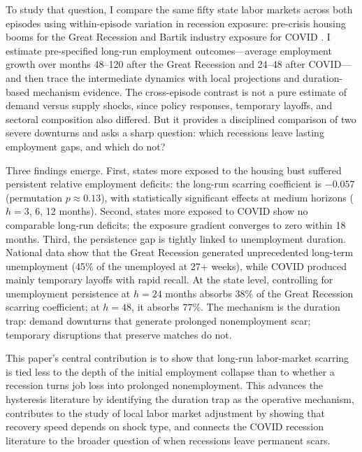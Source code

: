 \documentclass[12pt]{article}
\begin{document}
To study that question, I compare the same fifty state labor markets across both episodes using within-episode variation in recession exposure: pre-crisis housing booms for the Great Recession \citep{mian2014explains} and Bartik industry exposure for COVID \citep{goldsmith2020bartik}. I estimate pre-specified long-run employment outcomes---average employment growth over months 48--120 after the Great Recession and 24--48 after COVID---and then trace the intermediate dynamics with local projections and duration-based mechanism evidence. The cross-episode contrast is not a pure estimate of demand versus supply shocks, since policy responses, temporary layoffs, and sectoral composition also differed. But it provides a disciplined comparison of two severe downturns and asks a sharp question: which recessions leave lasting employment gaps, and which do not?

Three findings emerge. First, states more exposed to the housing bust suffered persistent relative employment deficits: the long-run scarring coefficient is $-0.057$ (permutation $p \approx 0.13$), with statistically significant effects at medium horizons ($h = 3$, 6, 12 months). Second, states more exposed to COVID show no comparable long-run deficits; the exposure gradient converges to zero within 18 months. Third, the persistence gap is tightly linked to unemployment duration. National data show that the Great Recession generated unprecedented long-term unemployment (45\% of the unemployed at 27+ weeks), while COVID produced mainly temporary layoffs with rapid recall. At the state level, controlling for unemployment persistence at $h = 24$ months absorbs 38\% of the Great Recession scarring coefficient; at $h = 48$, it absorbs 77\%. The mechanism is the duration trap: demand downturns that generate prolonged nonemployment scar; temporary disruptions that preserve matches do not.

This paper's central contribution is to show that long-run labor-market scarring is tied less to the depth of the initial employment collapse than to whether a recession turns job loss into prolonged nonemployment. This advances the hysteresis literature \citep{blanchard1986hysteresis, cerra2008growth, cerra2023hysteresis} by identifying the duration trap as the operative mechanism, contributes to the study of local labor market adjustment \citep{blanchard1992regional, autor2013china, yagan2019employment} by showing that recovery speed depends on shock type, and connects the COVID recession literature \citep{chetty2020real, cajner2020us, autor2022paycheck} to the broader question of when recessions leave permanent scars.
\end{document}
